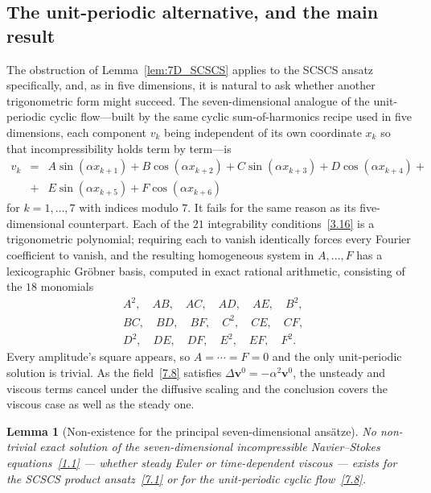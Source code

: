 \documentclass[11pt]{jfm}
\newtheorem{lemma}{Lemma}[section]
\numberwithin{equation}{section}
\begin{document}
\subsection{The unit-periodic alternative, and the main result}
The obstruction of Lemma~\ref{lem:7D_SCSCS} applies to the SCSCS ansatz specifically, and, as in
five dimensions, it is natural to ask whether another trigonometric form might succeed. The
seven-dimensional analogue of the unit-periodic cyclic flow---built by the same
cyclic sum-of-harmonics recipe used in five dimensions, each component $v_k$ being independent of
its own coordinate $x_k$ so that incompressibility holds term by term---is
\begin{eqnarray}
\label{7.8}
v_k &=& A\sin(\alpha x_{k+1}) + B\cos(\alpha x_{k+2}) + C\sin(\alpha x_{k+3}) + D\cos(\alpha x_{k+4}) +\nonumber\\
&+&E\sin(\alpha x_{k+5}) + F\cos(\alpha x_{k+6})
\end{eqnarray}
for $k=1,\dots,7$ with indices modulo $7$. It fails for the same reason as its five-dimensional
counterpart. Each of the $21$ integrability conditions~\eqref{3.16} is a trigonometric polynomial;
requiring each to vanish identically forces every Fourier coefficient to vanish, and the resulting
homogeneous system in $A,\dots,F$ has a lexicographic Gr\"obner basis, computed in exact rational
arithmetic, consisting of the $18$ monomials
\begin{equation}
\label{7.9}
\begin{aligned}
&A^2,\quad AB,\quad AC,\quad AD,\quad AE,\quad B^2,\\
&BC,\quad BD,\quad BF,\quad C^2,\quad CE,\quad CF,\\
&D^2,\quad DE,\quad DF,\quad E^2,\quad EF,\quad F^2 .
\end{aligned}
\end{equation}
Every amplitude's square appears, so $A=\cdots=F=0$ and the only unit-periodic solution is
trivial. As the field~\eqref{7.8} satisfies $\Delta\boldsymbol{v}^0=-\alpha^2\boldsymbol{v}^0$, the
unsteady and viscous terms cancel under the diffusive scaling and the conclusion covers the
viscous case as well as the steady one.

\begin{lemma}[Non-existence for the principal seven-dimensional ans\"atze]
\label{lem:7D_main}
No non-trivial exact solution of the seven-dimensional incompressible Navier--Stokes
equations~\eqref{1.1} --- whether steady Euler or time-dependent viscous --- exists for the SCSCS
product ansatz~\eqref{7.1} or for the unit-periodic cyclic flow~\eqref{7.8}.
\end{lemma}
\end{document}
